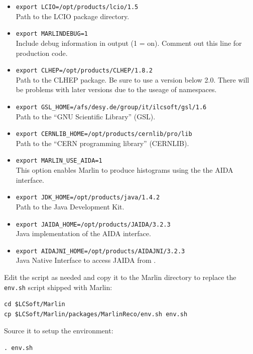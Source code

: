 \begin{itemize}
\item {\tt export LCIO=/opt/products/lcio/1.5} \\
      Path to the LCIO package directory.
\item {\tt export MARLINDEBUG=1} \\
      Include debug information in output (1 = on). 
      Comment out this line for production code. 
\item {\tt export CLHEP=/opt/products/CLHEP/1.8.2} \\ 
      Path to the CLHEP package. Be sure to use a version below 2.0. 
      There will be problems with later versions due to the useage of 
      namespaces.
\item {\tt export GSL\_HOME=/afs/desy.de/group/it/ilcsoft/gsl/1.6} \\
      Path to the ``GNU Scientific Library'' (GSL).
\item {\tt export CERNLIB\_HOME=/opt/products/cernlib/pro/lib} \\
      Path to the ``CERN programming library'' (CERNLIB).
\item {\tt export MARLIN\_USE\_AIDA=1} \\
      This option enables Marlin to produce histograms using the 
      the AIDA~\cite{ref_aida} interface. 
\item {\tt export JDK\_HOME=/opt/products/java/1.4.2} \\
      Path to the Java Development Kit. 
\item {\tt export JAIDA\_HOME=/opt/products/JAIDA/3.2.3} \\
      Java implementation of the AIDA interface.
\item {\tt export AIDAJNI\_HOME=/opt/products/AIDAJNI/3.2.3} \\
      Java Native Interface to access JAIDA from \CPP{}. 
\end{itemize}

Edit the script as needed and copy it to the Marlin directory to
replace the {\tt env.sh} script shipped with Marlin:

\begin{verbatim}
cd $LCSoft/Marlin 
cp $LCSoft/Marlin/packages/MarlinReco/env.sh env.sh
\end{verbatim}

Source it to setup the environment:

\begin{verbatim}
. env.sh 
\end{verbatim}

